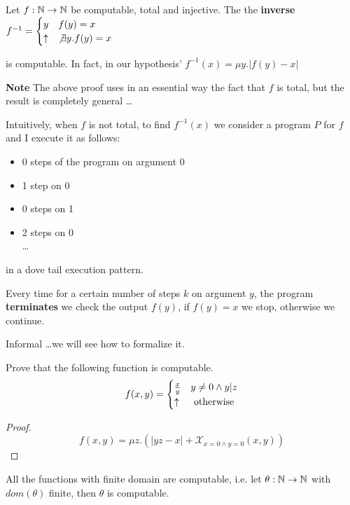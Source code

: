 \begin{exercise}
  Let $f:\mathbb{N}\rightarrow\mathbb{N}$ be computable, total and injective. The
  the \textbf{inverse} $f^{-1} = \begin{cases}
    y        & f(y) = x                \\
    \uparrow & \not\exists y. f(y) = x
\end{cases}$

is computable. In fact, in our hypothesis' $f^{-1}(x) = \mu y. |f(y)-x|$
\end{exercise}

\textbf{Note} The above proof uses in an essential way the fact that $f$ is total, but the result is completely general \dots

Intuitively, when $f$ is not total, to find $f^{-1}(x)$ we consider a program $P$ for $f$ and I execute it as follows:
\begin{itemize}
\item 0 steps of the program on argument 0
\item 1 step on 0
\item 0 steps on 1
\item 2 steps on 0\\
  \dots
\end{itemize}
in a dove tail execution pattern.

Every time for a certain number of steps $k$ on argument $y$, the program \textbf{terminates} we check the output $f(y)$, if $f(y) = x$ we stop, otherwise we continue.

Informal \dots we will see how to formalize it.

\begin{exercise}
  Prove that the following function is computable.
  \[f(x,y) = \begin{cases}
    \frac{x}{y} & y\not= 0 \land y|z \\
    \uparrow    & $ otherwise $
  \end{cases}\]
  \begin{proof}
    \[ f(x,y) = \mu z. (|yz-x| + \mathcal{X}_{x=0\land y=0}(x,y)) \]
  \end{proof}
\end{exercise}


\begin{lemma}
  All the functions with finite domain are computable, i.e. let
  $\theta: \mathbb{N}\rightarrow\mathbb{N}$ with $dom(\theta)$ finite, then
  $\theta$ is computable.
\end{lemma}
  
